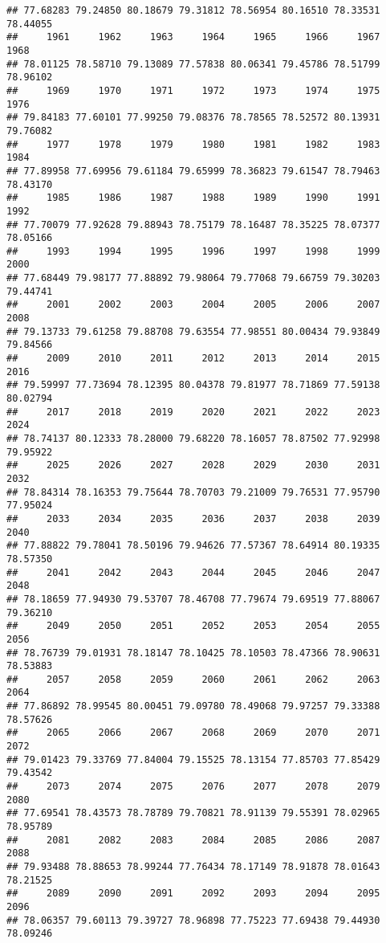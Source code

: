 \documentclass[
]{article}
\begin{document}
\begin{verbatim}
## 77.68283 79.24850 80.18679 79.31812 78.56954 80.16510 78.33531 78.44055 
##     1961     1962     1963     1964     1965     1966     1967     1968 
## 78.01125 78.58710 79.13089 77.57838 80.06341 79.45786 78.51799 78.96102 
##     1969     1970     1971     1972     1973     1974     1975     1976 
## 79.84183 77.60101 77.99250 79.08376 78.78565 78.52572 80.13931 79.76082 
##     1977     1978     1979     1980     1981     1982     1983     1984 
## 77.89958 77.69956 79.61184 79.65999 78.36823 79.61547 78.79463 78.43170 
##     1985     1986     1987     1988     1989     1990     1991     1992 
## 77.70079 77.92628 79.88943 78.75179 78.16487 78.35225 78.07377 78.05166 
##     1993     1994     1995     1996     1997     1998     1999     2000 
## 77.68449 79.98177 77.88892 79.98064 79.77068 79.66759 79.30203 79.44741 
##     2001     2002     2003     2004     2005     2006     2007     2008 
## 79.13733 79.61258 79.88708 79.63554 77.98551 80.00434 79.93849 79.84566 
##     2009     2010     2011     2012     2013     2014     2015     2016 
## 79.59997 77.73694 78.12395 80.04378 79.81977 78.71869 77.59138 80.02794 
##     2017     2018     2019     2020     2021     2022     2023     2024 
## 78.74137 80.12333 78.28000 79.68220 78.16057 78.87502 77.92998 79.95922 
##     2025     2026     2027     2028     2029     2030     2031     2032 
## 78.84314 78.16353 79.75644 78.70703 79.21009 79.76531 77.95790 77.95024 
##     2033     2034     2035     2036     2037     2038     2039     2040 
## 77.88822 79.78041 78.50196 79.94626 77.57367 78.64914 80.19335 78.57350 
##     2041     2042     2043     2044     2045     2046     2047     2048 
## 78.18659 77.94930 79.53707 78.46708 77.79674 79.69519 77.88067 79.36210 
##     2049     2050     2051     2052     2053     2054     2055     2056 
## 78.76739 79.01931 78.18147 78.10425 78.10503 78.47366 78.90631 78.53883 
##     2057     2058     2059     2060     2061     2062     2063     2064 
## 77.86892 78.99545 80.00451 79.09780 78.49068 79.97257 79.33388 78.57626 
##     2065     2066     2067     2068     2069     2070     2071     2072 
## 79.01423 79.33769 77.84004 79.15525 78.13154 77.85703 77.85429 79.43542 
##     2073     2074     2075     2076     2077     2078     2079     2080 
## 77.69541 78.43573 78.78789 79.70821 78.91139 79.55391 78.02965 78.95789 
##     2081     2082     2083     2084     2085     2086     2087     2088 
## 79.93488 78.88653 78.99244 77.76434 78.17149 78.91878 78.01643 78.21525 
##     2089     2090     2091     2092     2093     2094     2095     2096 
## 78.06357 79.60113 79.39727 78.96898 77.75223 77.69438 79.44930 78.09246 

\end{verbatim}
\end{document}
